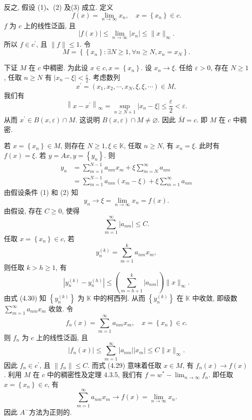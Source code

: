 \documentclass[openany]{ctexbook}
\makeatletter
\theoremstyle{kaiti}
\theoremstyle{normal}
\renewenvironment{proof}[1][\proofname]{\par
    \pushQED{\qed}%
    \normalfont \topsep6\p@\@plus6\p@\relax
    \trivlist
    \item\relax
    {\heiti #1}\hspace{2\labelsep}\ignorespaces
  }{%
    \popQED\endtrivlist\@endpefalse
  }
\makeatother
\begin{document}
\begin{proof}
反之, 假设 (1)、(2) 及(3) 成立. 定义
$$
f(x)=\lim_{n \rightarrow \infty} x_n, \quad x=\left\{x_n\right\} \in c.
$$
$f$ 为 $c$ 上的线性泛函, 且
$$
|f(x)| \leqslant \lim_{n \rightarrow \infty}\left|x_n\right| \leqslant\|x\|_{\infty}.
$$
所以 $f \in c^{\prime}$, 且 $\|f\| \leqslant 1$. 令
$$
M=\left\{\left\{x_n\right\}: \exists N \geqslant 1, \forall n \geqslant N, x_n=x_{N}\right\}.
$$

下证 $M$ 在 $c$ 中稠密. 为此设 $x \in c, x=\left\{x_n\right\}$. 设 $x_n \rightarrow \xi$. 任给 $\varepsilon>0$, 存在 $N \geqslant 1$, 任取 $n \geqslant N$ 有 $\left|x_n-\xi\right|<\frac{\varepsilon}{2}$. 考虑数列
$$
x^{\prime}=\left(x_1, x_2, \cdots, x_{N}, \xi, \xi, \cdots\right) \in M,
$$
我们有
$$
\left\|x-x^{\prime}\right\|_{\infty}=\sup_{n \geqslant N+1}\left|x_n-\xi\right| \leqslant \frac{\varepsilon}{2}<\varepsilon.
$$
从而 $x^{\prime} \in B(x, \varepsilon) \cap M$. 这说明 $B(x, \varepsilon) \cap M \neq \varnothing$. 因此 $\bar{M}=c$. 即 $M$ 在 $c$ 中稠密.

若 $x=\left\{x_n\right\} \in M$, 则存在 $N \geqslant 1, \xi \in \mathbb{K}$, 任取 $n \geqslant N$, 有 $x_n=\xi$. 此时有 $f(x)=\xi$. 若 $y=A x, y=\left\{y_n\right\}$. 则
$$
\begin{aligned}
y_n &=\sum_{m=1}^{N-1} a_{n m} x_m+\xi \sum_{m=N}^{\infty} a_{n m} \\
&=\sum_{m=1}^{N-1} a_{n m}\left(x_m-\xi\right)+\xi \sum_{m=1}^{\infty} a_{n m}
\end{aligned}
$$
由假设条件 (1) 和 (2) 知
\begin{equation}
  y_n \rightarrow \xi=\lim_{n \rightarrow \infty} x_n=f(x).
\end{equation}
由假设, 存在 $C \geqslant 0$, 使得
\begin{equation}
  \sum_{m=1}^{\infty}\left|a_{n m}\right| \leqslant C.
\end{equation}
任取 $x=\left\{x_n\right\} \in c$, 若
$$
y_n^{(k)}=\sum_{m=1}^{k} a_{n m} x_m,
$$
则任取 $k>h \geqslant 1$, 有
$$
\left|y_n^{(k)}-y_n^{(h)}\right| \leqslant\left(\sum_{m=h+1}^{k}\left|a_{n m}\right|\right)\|x\|_{\infty}.
$$
由式 (4.30) 知 $\left\{y_n^{(k)}\right\}$ 为 $\mathbb{K}$ 中的柯西列. 从而 $\left\{y_n^{(k)}\right\}$ 在 $\mathbb{K}$ 中收敛, 即级数 $\sum_{m=1}^{\infty} a_{n m} x_m$ 收敛. 令
$$
f_n(x)=\sum_{m=1}^{\infty} a_{n m} x_m, \quad x=\left\{x_n\right\} \in c.
$$
则 $f_n$ 为 $c$ 上的线性泛函, 且
$$
\left|f_n(x)\right| \leqslant \sum_{m=1}^{\infty}\left|a_{n m}\right|\left|x_m\right| \leqslant C\|x\|_{\infty}.
$$
因此 $f_n \in c^{\prime}$, 且 $\left\|f_n\right\| \leqslant C$. 而式 (4.29) 意味着任取 $x \in M$, 有 $f_n(x) \rightarrow f(x)$. 利用 $M$ 在 $c$ 中的稠密性及定理 4.3.5, 我们有 $f=w^{*}-\lim_{n \rightarrow \infty} f_n$. 即任取 $x=\left\{x_n\right\} \in c$, 有
$$
\sum_{m=1}^{\infty} a_{n m} x_m \rightarrow f(x)=\lim_{n \rightarrow \infty} x_n.
$$
因此 $A^{-}$方法为正则的.
\end{proof}
\end{document}
